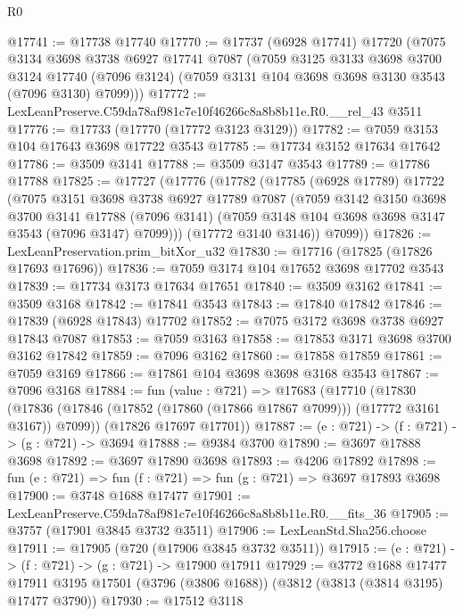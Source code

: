 \begin{lexlean}{R0}
\begin{coremodule}
@17741 := @17738 @17740
@17770 := @17737
    (@6928 @17741)
    @17720
    (@7075
      @3134
      @3698
      @3738
      @6927
      @17741
      @7087
      (@7059
        @3125
        @3133
        @3698
        @3700
        @3124
        @17740
        (@7096 @3124)
        (@7059 @3131 @104 @3698 @3698 @3130 @3543 (@7096 @3130) @7099)))
@17772 := LexLeanPreserve.C59da78af981c7e10f46266c8a8b8b11e.R0.__rel_43 @3511
@17776 := @17733 (@17770 (@17772 @3123 @3129))
@17782 := @7059 @3153 @104 @17643 @3698 @17722 @3543
@17785 := @17734 @3152 @17634 @17642
@17786 := @3509 @3141
@17788 := @3509 @3147 @3543
@17789 := @17786 @17788
@17825 := @17727
    (@17776
      (@17782
        (@17785
          (@6928 @17789)
          @17722
          (@7075
            @3151
            @3698
            @3738
            @6927
            @17789
            @7087
            (@7059
              @3142
              @3150
              @3698
              @3700
              @3141
              @17788
              (@7096 @3141)
              (@7059 @3148 @104 @3698 @3698 @3147 @3543 (@7096 @3147) @7099)))
          (@17772 @3140 @3146))
        @7099))
@17826 := LexLeanPreservation.prim_bitXor_u32
@17830 := @17716 (@17825 (@17826 @17693 @17696))
@17836 := @7059 @3174 @104 @17652 @3698 @17702 @3543
@17839 := @17734 @3173 @17634 @17651
@17840 := @3509 @3162
@17841 := @3509 @3168
@17842 := @17841 @3543
@17843 := @17840 @17842
@17846 := @17839 (@6928 @17843) @17702
@17852 := @7075 @3172 @3698 @3738 @6927 @17843 @7087
@17853 := @7059 @3163
@17858 := @17853 @3171 @3698 @3700 @3162 @17842
@17859 := @7096 @3162
@17860 := @17858 @17859
@17861 := @7059 @3169
@17866 := @17861 @104 @3698 @3698 @3168 @3543
@17867 := @7096 @3168
@17884 := fun (value : @721) =>
  @17683
    (@17710
      (@17830 (@17836 (@17846 (@17852 (@17860 (@17866 @17867 @7099))) (@17772 @3161 @3167)) @7099))
      (@17826 @17697 @17701))
@17887 := (e : @721) -> (f : @721) -> (g : @721) -> @3694
@17888 := @9384 @3700
@17890 := @3697 @17888 @3698
@17892 := @3697 @17890 @3698
@17893 := @4206 @17892
@17898 := fun (e : @721) => fun (f : @721) => fun (g : @721) => @3697 @17893 @3698
@17900 := @3748 @1688 @17477
@17901 := LexLeanPreserve.C59da78af981c7e10f46266c8a8b8b11e.R0.__fits_36
@17905 := @3757 (@17901 @3845 @3732 @3511)
@17906 := LexLeanStd.Sha256.choose
@17911 := @17905 (@720 (@17906 @3845 @3732 @3511))
@17915 := (e : @721) -> (f : @721) -> (g : @721) -> @17900 @17911
@17929 := @3772
    @1688
    @17477
    @17911
    @3195
    @17501
    (@3796 (@3806 @1688))
    (@3812 (@3813 (@3814 @3195) @17477 @3790))
@17930 := @17512 @3118

\end{coremodule}
\end{lexlean}
